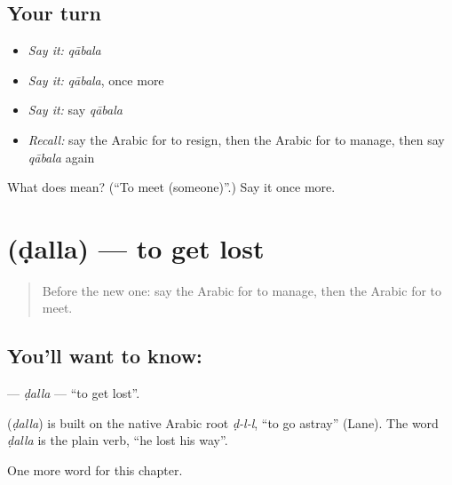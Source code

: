 \subsection*{Your turn}
\begin{itemize}
\raggedright
  \item \emph{Say it:} \emph{qābala}
  \item \emph{Say it:} \emph{qābala}, once more
  \item \emph{Say it:} say \emph{qābala}
  \item \emph{Recall:} say the Arabic for to resign, then the Arabic for to manage, then say \emph{qābala} again
\end{itemize}

\begin{tcolorbox}[breakable,colback=teal!4,colframe=teal!35!black,title={Before you move on}]
What does  mean? (\textquotedblleft{}To meet (someone)\textquotedblright{}.) Say it once more.
\end{tcolorbox}
\section[\texorpdfstring{\ar{ضل} (ḍalla)}{ضل (ḍalla)}]{ (ḍalla) — to get lost}

\label{lesson:AR-C195-dalla}



\begin{quote}
Before the new one: say the Arabic for to manage, then the Arabic for to meet.
\end{quote}

\subsection*{You'll want to know: }
\textbf{} — \emph{ḍalla} — \textquotedblleft{}to get lost\textquotedblright{}.

\begin{cousinweb}
\textbf{} (\emph{ḍalla}) is built on the native Arabic root \emph{ḍ-l-l}, \textquotedblleft{}to go astray\textquotedblright{} (Lane). The word \emph{ḍalla} is the plain verb, \textquotedblleft{}he lost his way\textquotedblright{}.
\end{cousinweb}

\begin{grammarlens}[title={What you've built}]
One more word for this chapter.
\end{grammarlens}

